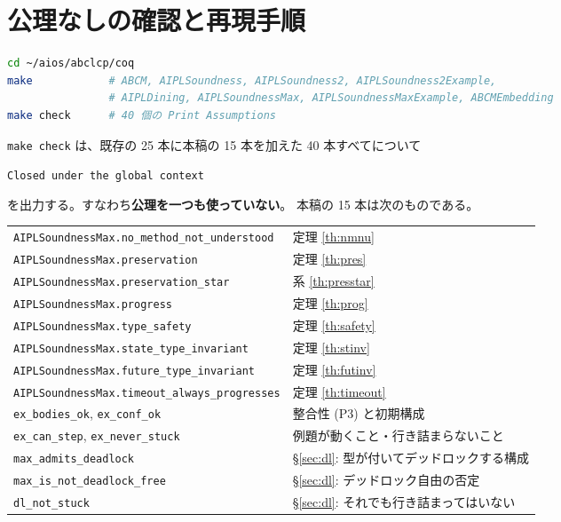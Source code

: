 \documentclass[11pt,a4paper]{ltjsarticle}
\theoremstyle{definition}
\theoremstyle{remark}
\begin{document}
\section{公理なしの確認と再現手順}

\begin{lstlisting}[language=bash]
cd ~/aios/abclcp/coq
make            # ABCM, AIPLSoundness, AIPLSoundness2, AIPLSoundness2Example,
                # AIPLDining, AIPLSoundnessMax, AIPLSoundnessMaxExample, ABCMEmbedding
make check      # 40 個の Print Assumptions
\end{lstlisting}

\texttt{make check} は、既存の 25 本に本稿の 15 本を加えた 40 本すべてについて
\begin{center}
\texttt{Closed under the global context}
\end{center}
を出力する。すなわち\textbf{公理を一つも使っていない}。
本稿の 15 本は次のものである。

\begin{center}
\small
\begin{tabular}{ll}
\toprule
\texttt{AIPLSoundnessMax.no\_method\_not\_understood} & 定理 \ref{th:nmnu} \\
\texttt{AIPLSoundnessMax.preservation} & 定理 \ref{th:pres} \\
\texttt{AIPLSoundnessMax.preservation\_star} & 系 \ref{th:presstar} \\
\texttt{AIPLSoundnessMax.progress} & 定理 \ref{th:prog} \\
\texttt{AIPLSoundnessMax.type\_safety} & 定理 \ref{th:safety} \\
\texttt{AIPLSoundnessMax.state\_type\_invariant} & 定理 \ref{th:stinv} \\
\texttt{AIPLSoundnessMax.future\_type\_invariant} & 定理 \ref{th:futinv} \\
\texttt{AIPLSoundnessMax.timeout\_always\_progresses} & 定理 \ref{th:timeout} \\
\texttt{ex\_bodies\_ok}, \texttt{ex\_conf\_ok} & 整合性 (P3) と初期構成 \\
\texttt{ex\_can\_step}, \texttt{ex\_never\_stuck} & 例題が動くこと・行き詰まらないこと \\
\texttt{max\_admits\_deadlock} & \S\ref{sec:dl}: 型が付いてデッドロックする構成 \\
\texttt{max\_is\_not\_deadlock\_free} & \S\ref{sec:dl}: デッドロック自由の否定 \\
\texttt{dl\_not\_stuck} & \S\ref{sec:dl}: それでも行き詰まってはいない \\
\bottomrule
\end{tabular}
\end{center}
\end{document}
